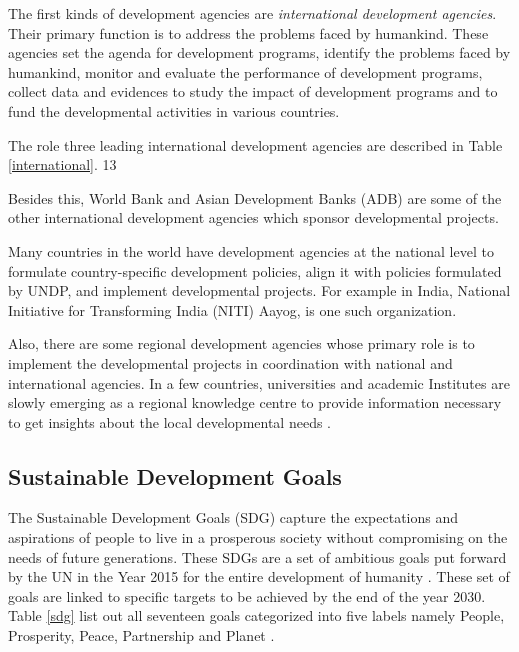 \documentclass[10pt]{IETBook}
\begin{document}
The first kinds of development agencies are {\em international development agencies}. Their primary function is to address the problems faced by humankind. These agencies set the agenda
for development programs, identify the problems faced by humankind, monitor and evaluate the performance of development programs, collect data and evidences to study the impact of development programs and to fund the developmental activities in various countries. 

The role three leading international development agencies are described in Table \ref{international}.  
13

Besides this,  World Bank and Asian Development Banks (ADB) are some of the other international development agencies which sponsor developmental projects.

Many countries in the world have development agencies at the national level to formulate country-specific development policies, align it with policies formulated by UNDP, and implement developmental projects. For example in India, National Initiative for Transforming India (NITI) Aayog, is one such organization.

Also, there are some regional development agencies whose primary role is to implement the developmental projects in coordination with national and international agencies. In a few countries, universities and academic Institutes are slowly emerging as a regional knowledge centre to provide information necessary to get insights about the local developmental needs \cite{uni}.


\subsection{Sustainable Development Goals}
The Sustainable Development Goals (SDG) capture the expectations and aspirations of people to live in a prosperous society without compromising on the needs of future generations. These SDGs are a set of ambitious goals put forward by the UN in the Year 2015 for the entire development of humanity \cite{assembly2015sustainable,nilsson2016policy}. These set of goals are linked 
to specific targets to be achieved by the end of the year 2030. Table \ref{sdg} list out all seventeen goals categorized into five labels namely People, Prosperity, Peace, Partnership and Planet \cite{wu2018information}.
\end{document}
